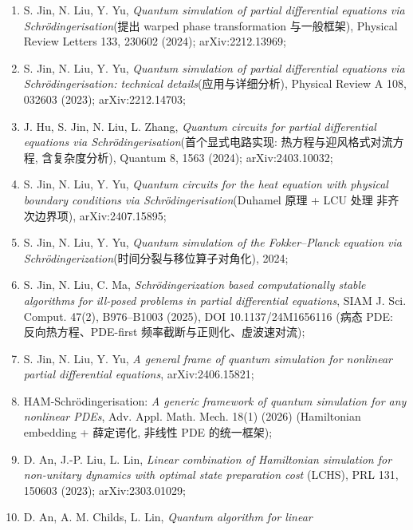 \documentclass[utf8]{article} %
\numberwithin{equation}{section}   %
\newtheorem{Note}{\hskip 2em {\color{red} 注}}[subsection]
\begin{document}
\begin{Note}[薛定谔化方法的文献]
    \begin{enumerate}
        \item S. Jin, N. Liu, Y. Yu, \emph{Quantum simulation of partial differential
        equations via Schrödingerisation}(提出 warped phase transformation 与一般框架),
        Physical Review Letters 133, 230602 (2024); arXiv:2212.13969;
        \item S. Jin, N. Liu, Y. Yu, \emph{Quantum simulation of partial differential
        equations via Schrödingerisation: technical details}(应用与详细分析),
        Physical Review A 108, 032603 (2023); arXiv:2212.14703;
        \item J. Hu, S. Jin, N. Liu, L. Zhang, \emph{Quantum circuits for partial
        differential equations via Schrödingerisation}(首个显式电路实现:
        热方程与迎风格式对流方程, 含复杂度分析),
        Quantum 8, 1563 (2024); arXiv:2403.10032;
        \item S. Jin, N. Liu, Y. Yu, \emph{Quantum circuits for the heat equation with
        physical boundary conditions via Schrödingerisation}(Duhamel 原理 + LCU 处理
        非齐次边界项), arXiv:2407.15895;
        \item S. Jin, N. Liu, Y. Yu, \emph{Quantum simulation of the Fokker--Planck
        equation via Schrödingerization}(时间分裂与移位算子对角化), 2024;
        \item S. Jin, N. Liu, C. Ma, \emph{Schrödingerization based computationally
        stable algorithms for ill-posed problems in partial differential equations},
        SIAM J. Sci. Comput. 47(2), B976--B1003 (2025), DOI 10.1137/24M1656116
        (病态 PDE: 反向热方程、PDE-first 频率截断与正则化、虚波速对流);
        \item S. Jin, N. Liu, Y. Yu, \emph{A general frame of quantum simulation for
        nonlinear partial differential equations}, arXiv:2406.15821;
        \item HAM-Schrödingerisation: \emph{A generic framework of quantum simulation
        for any nonlinear PDEs}, Adv. Appl. Math. Mech. 18(1) (2026)
        (Hamiltonian embedding + 薛定谔化, 非线性 PDE 的统一框架);
        \item D. An, J.-P. Liu, L. Lin, \emph{Linear combination of Hamiltonian
        simulation for non-unitary dynamics with optimal state preparation cost}
        (LCHS), PRL 131, 150603 (2023); arXiv:2303.01029;
        \item D. An, A. M. Childs, L. Lin, \emph{Quantum algorithm for linear
}
\end{enumerate}
\end{Note}
\end{document}
